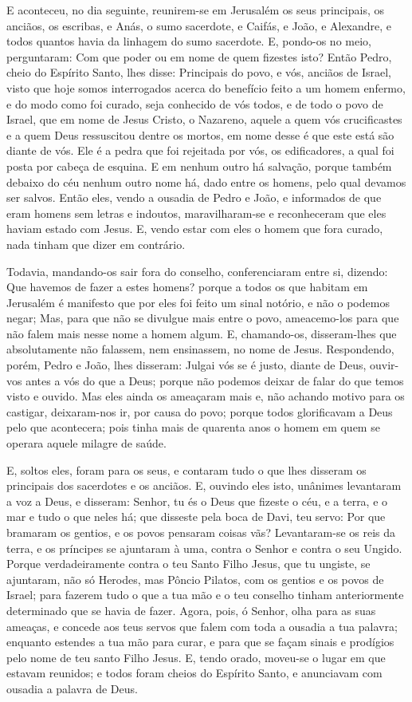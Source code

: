 E aconteceu, no dia seguinte, reunirem-se em Jerusalém os seus
principais, os anciãos, os escribas, e Anás, o sumo sacerdote, e
Caifás, e João, e Alexandre, e todos quantos havia da linhagem do
sumo sacerdote. E, pondo-os no meio, perguntaram: Com que poder
ou em nome de quem fizestes isto? Então Pedro, cheio do Espírito
Santo, lhes disse: Principais do povo, e vós, anciãos de Israel,
visto que hoje somos interrogados acerca do benefício feito a um
homem enfermo, e do modo como foi curado, seja conhecido de
vós todos, e de todo o povo de Israel, que em nome de Jesus Cristo,
o Nazareno, aquele a quem vós crucificastes e a quem Deus
ressuscitou dentre os mortos, em nome desse é que este está são
diante de vós. Ele é a pedra que foi rejeitada por vós, os
edificadores, a qual foi posta por cabeça de esquina. E em
nenhum outro há salvação, porque também debaixo do céu nenhum outro
nome há, dado entre os homens, pelo qual devamos ser salvos.
Então eles, vendo a ousadia de Pedro e João, e informados de
que eram homens sem letras e indoutos, maravilharam-se e
reconheceram que eles haviam estado com Jesus. E, vendo estar
com eles o homem que fora curado, nada tinham que dizer em
contrário.

Todavia, mandando-os sair fora do conselho, conferenciaram entre
si, dizendo: Que havemos de fazer a estes homens? porque a
todos os que habitam em Jerusalém é manifesto que por eles foi feito
um sinal notório, e não o podemos negar; Mas, para que não se
divulgue mais entre o povo, ameacemo-los para que não falem mais
nesse nome a homem algum. E, chamando-os, disseram-lhes que
absolutamente não falassem, nem ensinassem, no nome de Jesus.
Respondendo, porém, Pedro e João, lhes disseram: Julgai vós
se é justo, diante de Deus, ouvir-vos antes a vós do que a Deus;
porque não podemos deixar de falar do que temos visto e
ouvido. Mas eles ainda os ameaçaram mais e, não achando
motivo para os castigar, deixaram-nos ir, por causa do povo; porque
todos glorificavam a Deus pelo que acontecera; pois tinha
mais de quarenta anos o homem em quem se operara aquele milagre de
saúde.

E, soltos eles, foram para os seus, e contaram tudo o que lhes
disseram os principais dos sacerdotes e os anciãos. E,
ouvindo eles isto, unânimes levantaram a voz a Deus, e disseram:
Senhor, tu és o Deus que fizeste o céu, e a terra, e o mar e tudo o
que neles há; que disseste pela boca de Davi, teu servo: Por
que bramaram os gentios, e os povos pensaram coisas vãs?
Levantaram-se os reis da terra, e os príncipes se ajuntaram à
uma, contra o Senhor e contra o seu Ungido. Porque
verdadeiramente contra o teu Santo Filho Jesus, que tu ungiste, se
ajuntaram, não só Herodes, mas Pôncio Pilatos, com os gentios e os
povos de Israel; para fazerem tudo o que a tua mão e o teu
conselho tinham anteriormente determinado que se havia de fazer.
Agora, pois, ó Senhor, olha para as suas ameaças, e concede
aos teus servos que falem com toda a ousadia a tua palavra;
enquanto estendes a tua mão para curar, e para que se façam
sinais e prodígios pelo nome de teu santo Filho Jesus. E,
tendo orado, moveu-se o lugar em que estavam reunidos; e todos foram
cheios do Espírito Santo, e anunciavam com ousadia a palavra de
Deus.

